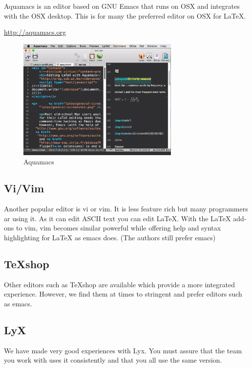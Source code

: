 Aquamacs is an editor based on GNU Emacs that runs on OSX and
integrates with the OSX desktop. This is for many the preferred editor
on OSX for \LaTeX.

\url{http://aquamacs.org}

\begin{figure}[!htb]
  \centering\includegraphics[width=8cm]{images/aquamacs.png}
  \caption{Aquamacs}
  \label{F:aquamacs}
\end{figure}


\subsection{Vi/Vim}\label{vivim}

Another popular editor is vi or vim. It is less feature rich but many
programmers ar using it. As it can edit ASCII text you can edit LaTeX.
With the LaTeX add-ons to vim, vim becomes similar powerful while
offering help and syntax highlighting for LaTeX as emacs does. (The
authors still prefer emacs)

\subsection{TeXshop}\label{texshop}

Other editors such as TeXshop are available which provide a more
integrated experience. However, we find them at times to stringent and
prefer editors such as emacs.

\subsection{LyX}\label{lyx}

We have made very good experiences with Lyx. You must assure that the
team you work with uses it consistently and that you all use the same
version.


